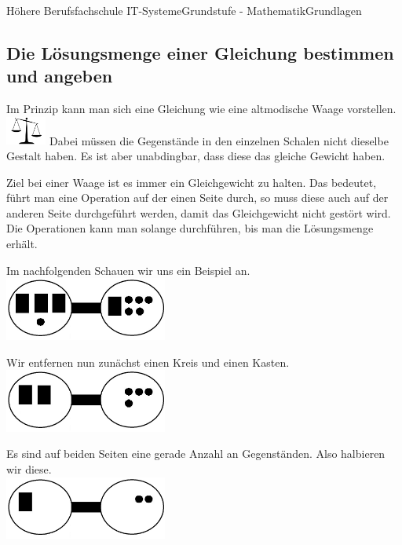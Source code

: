 \documentclass[11pt,twocolumn,oneside,openany,headings=optiontotoc,11pt,numbers=noenddot]{article}
\begin{document}
\begin{worksheet}{Höhere Berufsfachschule IT-Systeme}{Grundstufe - Mathematik}{Grundlagen}
		\subsection{Die Lösungsmenge einer Gleichung bestimmen und angeben}
		Im Prinzip kann man sich eine Gleichung wie eine altmodische Waage vorstellen.\\
		\includegraphics[width=0.1\textwidth]{../99_Bilder/waage.jpg} Dabei müssen die Gegenstände in den einzelnen Schalen nicht dieselbe Gestalt haben. Es ist aber unabdingbar, dass diese das gleiche Gewicht haben.\\
		\par\bigskip\noindent
		Ziel bei einer Waage ist es immer ein Gleichgewicht zu halten. Das bedeutet, führt man eine Operation auf der einen Seite durch, so muss diese auch auf der anderen Seite durchgeführt werden, damit das Gleichgewicht nicht gestört wird.\\
		Die Operationen kann man solange durchführen, bis man die Lösungsmenge erhält.\\
		\begin{framed}
			\noindent
			Im nachfolgenden Schauen wir uns ein Beispiel an.\\
			\centering
			\includegraphics[width=0.4\textwidth]{../99_Bilder/L.jpg}\\
			\raggedright
			Wir entfernen nun zunächst einen Kreis und einen Kasten.\\
			\centering
			\includegraphics[width=0.4\textwidth]{../99_Bilder/L1.jpg}\\
			\raggedright
			Es sind auf beiden Seiten eine gerade Anzahl an \glqq{}Gegenständen\grqq{}. Also halbieren wir diese.\\
			\centering
			\includegraphics[width=0.4\textwidth]{../99_Bilder/L2.jpg}\\

\end{framed}
\end{worksheet}
\end{document}

